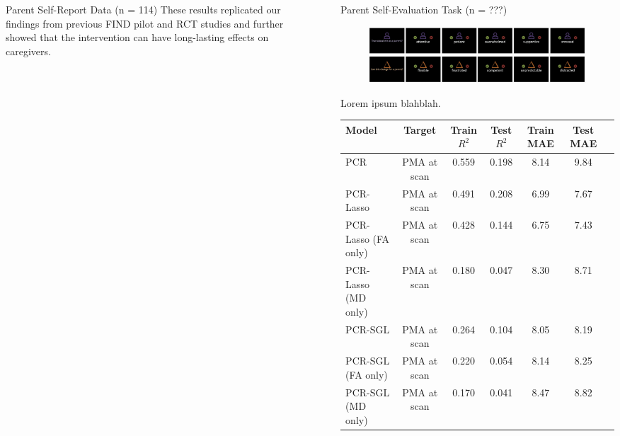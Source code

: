\documentclass[final]{beamer}
\newlength{\sepwidth}
\newlength{\colwidth}
\newcommand{\separatorcolumn}{\begin{column}{\sepwidth}\end{column}}
\begin{document}
\begin{frame}[t]
\begin{columns}[t]
\begin{column}{\colwidth}
\begin{block}{Parent Self-Report Data (n = 114)}
    These results replicated our findings from previous FIND pilot and RCT studies and further showed that the intervention can have long-lasting effects on caregivers.
    
  \end{block}
\end{column}

\separatorcolumn

\begin{column}{\colwidth}
  
  \begin{block}{Parent Self-Evaluation Task (n = ???)}
    
    \begin{figure}[ht]
      \centering
      \includegraphics[clip, width=\textwidth]{pset.png}
      \label{fig:pset}
    \end{figure}
    
    Lorem ipsum blahblah.

    \begin{table}[ht]
      \centering
      \fontsize{9}{11}\selectfont
      \begin{tabularx}{\textwidth}{l c c c c c c}
        \toprule
        \textbf{Model} & \textbf{Target} & \textbf{Train $R^2$} & \textbf{Test $R^2$} & \textbf{Train MAE} &
        \textbf{Test MAE} \\
        \midrule
         PCR & PMA at scan & 0.559 & 0.198 & 8.14 & 9.84 \\
        \midrule
        \rowcolor{yellow!50} PCR-Lasso & PMA at scan & 0.491 & 0.208 & 6.99 & 7.67 \\
        PCR-Lasso (FA only) & PMA at scan & 0.428 & 0.144 & 6.75 & 7.43 \\
        PCR-Lasso (MD only) & PMA at scan & 0.180 & 0.047 & 8.30 & 8.71 \\
        \midrule
        \rowcolor{yellow!50} PCR-SGL & PMA at scan & 0.264 & 0.104 & 8.05 & 8.19 \\
        PCR-SGL (FA only) & PMA at scan & 0.220 & 0.054 & 8.14 & 8.25 \\
        PCR-SGL (MD only) & PMA at scan & 0.170 & 0.041 & 8.47 & 8.82 \\
        \bottomrule
      \end{tabularx}
    \end{table}
    

\end{block}
\end{column}
\end{columns}
\end{frame}
\end{document}
